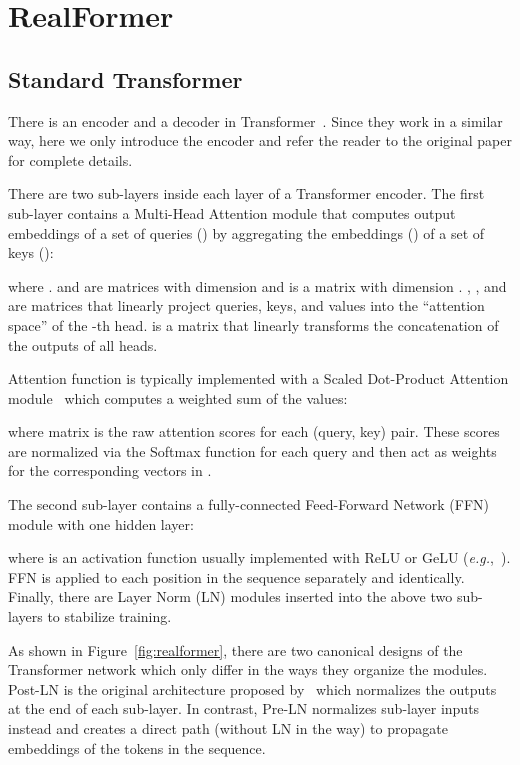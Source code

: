 \documentclass[11pt,a4paper]{article}
\begin{document}
\section{RealFormer}
\subsection{Standard Transformer}
There is an encoder and a decoder in Transformer~\citep{Vaswani-2017-attention}. Since they work in a similar way, here we only introduce the encoder and refer the reader to the original paper for complete details.

There are two sub-layers inside each layer of a Transformer encoder. The first sub-layer contains a Multi-Head Attention module that computes output embeddings of a set of queries () by aggregating the embeddings () of a set of keys ():

where .  and  are matrices with dimension  and  is a matrix with dimension . , , and  are matrices that linearly project queries, keys, and values into the ``attention space'' of the -th head.  is a matrix that linearly transforms the concatenation of the outputs of all heads.

Attention function is typically implemented with a Scaled Dot-Product Attention module~\citep{Vaswani-2017-attention} which computes a weighted sum of the values:

where matrix  is the raw attention scores for each (query, key) pair. These scores are normalized via the Softmax function for each query and then act as weights for the corresponding vectors in .

The second sub-layer contains a fully-connected Feed-Forward Network (FFN) module with one hidden layer:

where  is an activation function usually implemented with ReLU or GeLU (\emph{e.g.},~\citet{Devlin-2019-bert}). FFN is applied to each position in the sequence separately and identically.
Finally, there are Layer Norm (LN) modules inserted into the above two sub-layers to stabilize training.

As shown in Figure~\ref{fig:realformer}, there are two canonical designs of the Transformer network which only differ in the ways they organize the modules. Post-LN is the original architecture proposed by~\citet{Vaswani-2017-attention} which normalizes the outputs at the end of each sub-layer. In contrast, Pre-LN normalizes sub-layer inputs instead and creates a direct path (without LN in the way) to propagate embeddings of the tokens in the sequence.
\end{document}
